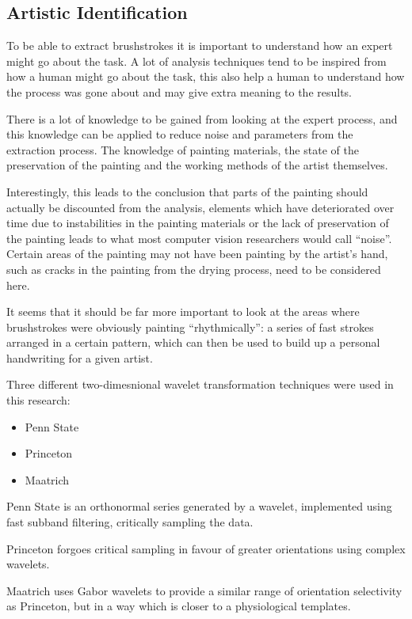 \documentclass[conference]{IEEEtran}
\begin{document}
\subsection{Artistic Identification}

To be able to extract brushstrokes it is important to understand how an expert
might go about the task. A lot of analysis techniques tend to be inspired from
how a human might go about the task, this also help a human to understand how
the process was gone about and may give extra meaning to the results.

There is a lot of knowledge to be gained from looking at the expert process,
and this knowledge can be applied to reduce noise and parameters from the
extraction process. The knowledge of painting materials, the state of the
preservation of the painting and the working methods of the artist themselves.

Interestingly, this leads to the conclusion that parts of the painting should
actually be discounted from the analysis, elements which have deteriorated over
time due to instabilities in the painting materials or the lack of preservation
of the painting leads to what most computer vision researchers would call
``noise''. Certain areas of the painting may not have been painting by the
artist's hand, such as cracks in the painting from the drying process, need to
be considered here.

It seems that it should be far more important to look at the areas where
brushstrokes were obviously painting ``rhythmically'': a series of fast strokes
arranged in a certain pattern, which can then be used to build up a personal
handwriting for a given artist\cite{johnson08image}.

Three different two-dimesnional wavelet transformation techniques were used in
this research:

\begin{itemize}
\item Penn State
\item Princeton
\item Maatrich
\end{itemize}

Penn State is an orthonormal series generated by a wavelet, implemented using
fast subband filtering, critically sampling the data.

Princeton forgoes critical sampling in favour of greater orientations using
complex wavelets.

Maatrich uses Gabor wavelets to provide a similar range of orientation
selectivity as Princeton, but in a way which is closer to a physiological
templates.
\end{document}
